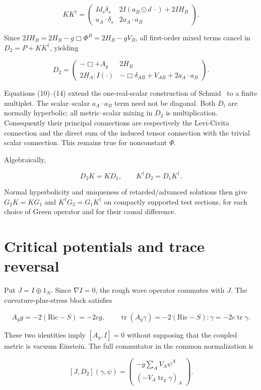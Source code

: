 \[
 KK^\dagger=
 \begin{pmatrix}
 I d_s\delta_s&2I(a_B\odot d\,\cdot)+2I H_B\\
 a_A\cdot\delta_s&2a_A\cdot a_B
 \end{pmatrix}.
 \tag{13}
\]

Since $2I H_B=2H_B-g\Box\Phi^B=2H_B-gV_B$, all first-order mixed terms cancel in $D_2=P+KK^\dagger$, yielding

\[
 \boxed{D_2=
 \begin{pmatrix}
 -\Box+A_g&2H_B\\
 2H_A:I(\cdot)&-\Box\delta_{AB}+V_{AB}+2a_A\cdot a_B
 \end{pmatrix}.}
 \tag{14}
\]

Equations (10)--(14) extend the one-real-scalar construction of Schmid~\cite[Section 2.2.5]{Schmid2026Thesis} to a finite multiplet. The scalar--scalar $a_A\cdot a_B$ term need not be diagonal. Both $D_i$ are normally hyperbolic; all metric--scalar mixing in $D_2$ is multiplication. Consequently their principal connections are respectively the Levi-Civita connection and the direct sum of the induced tensor connection with the trivial scalar connection. This remains true for nonconstant $\Phi$.

Algebraically,

\[
 D_2K=KD_1,\qquad K^\dagger D_2=D_1K^\dagger.
 \tag{15}
\]

Normal hyperbolicity and uniqueness of retarded/advanced solutions then give $G_2K=KG_1$ and $K^\dagger G_2=G_1K^\dagger$ on compactly supported test sections, for each choice of Green operator and for their causal difference.

\section{Critical potentials and trace reversal}

Put $J=I\oplus1_N$. Since $\nabla I=0$, the rough wave operator commutes with $J$. The curvature-plus-stress block satisfies

\[
 A_gg=-2(\mathrm{Ric}-S)=-2cg,\qquad
 \operatorname{tr}(A_g\gamma)=-2(\mathrm{Ric}-S):\gamma=-2c\operatorname{tr}\gamma.
\]

These two identities imply $[A_g,I]=0$ without supposing that the coupled metric is vacuum Einstein. The full commutator in the common normalization is

\[
 [J,D_2](\gamma,\psi)=
 \begin{pmatrix}
 -g\sum_AV_A\psi^A\\
 (-V_A\operatorname{tr}_g\gamma)_A
 \end{pmatrix}.
 \tag{16}
\]

